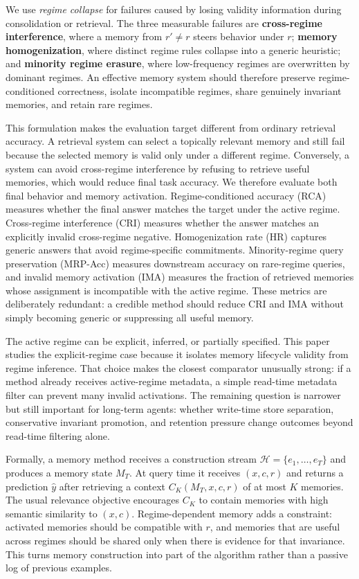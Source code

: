 \documentclass{article} %
\begin{document}
We use \emph{regime collapse} for failures caused by losing validity information during consolidation or retrieval.
The three measurable failures are \textbf{cross-regime interference}, where a memory from $r'\neq r$ steers behavior under $r$; \textbf{memory homogenization}, where distinct regime rules collapse into a generic heuristic; and \textbf{minority regime erasure}, where low-frequency regimes are overwritten by dominant regimes.
An effective memory system should therefore preserve regime-conditioned correctness, isolate incompatible regimes, share genuinely invariant memories, and retain rare regimes.

This formulation makes the evaluation target different from ordinary retrieval accuracy.
A retrieval system can select a topically relevant memory and still fail because the selected memory is valid only under a different regime.
Conversely, a system can avoid cross-regime interference by refusing to retrieve useful memories, which would reduce final task accuracy.
We therefore evaluate both final behavior and memory activation.
Regime-conditioned accuracy (RCA) measures whether the final answer matches the target under the active regime.
Cross-regime interference (CRI) measures whether the answer matches an explicitly invalid cross-regime negative.
Homogenization rate (HR) captures generic answers that avoid regime-specific commitments.
Minority-regime query preservation (MRP-Acc) measures downstream accuracy on rare-regime queries, and invalid memory activation (IMA) measures the fraction of retrieved memories whose assignment is incompatible with the active regime.
These metrics are deliberately redundant: a credible method should reduce CRI and IMA without simply becoming generic or suppressing all useful memory.

The active regime can be explicit, inferred, or partially specified.
This paper studies the explicit-regime case because it isolates memory lifecycle validity from regime inference.
That choice makes the closest comparator unusually strong: if a method already receives active-regime metadata, a simple read-time metadata filter can prevent many invalid activations.
The remaining question is narrower but still important for long-term agents: whether write-time store separation, conservative invariant promotion, and retention pressure change outcomes beyond read-time filtering alone.

Formally, a memory method receives a construction stream $\mathcal{H}=\{e_1,\ldots,e_T\}$ and produces a memory state $M_T$.
At query time it receives $(x,c,r)$ and returns a prediction $\hat y$ after retrieving a context $C_K(M_T,x,c,r)$ of at most $K$ memories.
The usual relevance objective encourages $C_K$ to contain memories with high semantic similarity to $(x,c)$.
Regime-dependent memory adds a constraint: activated memories should be compatible with $r$, and memories that are useful across regimes should be shared only when there is evidence for that invariance.
This turns memory construction into part of the algorithm rather than a passive log of previous examples.
\end{document}
